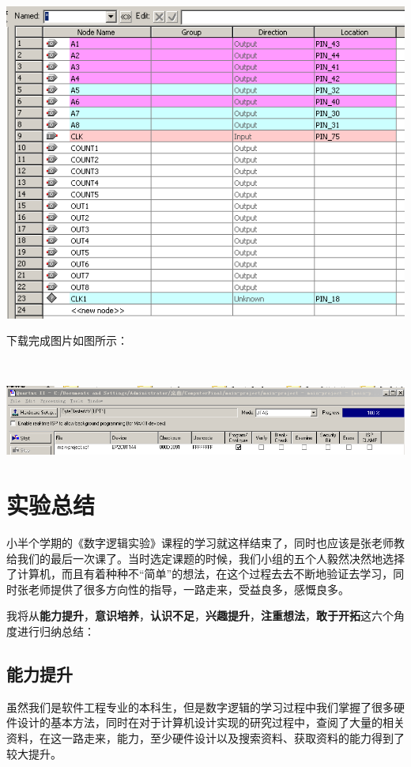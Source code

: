\documentclass[UTF8]{ctexart}
\begin{document}
    \includegraphics[width=1.0\textwidth]{./img/引脚使用.png}

    下载完成图片如图所示：

    ~

    \includegraphics[width=1.0\textwidth]{./img/下载成功.png}

    \newpage

    \section{实验总结}
    小半个学期的《数字逻辑实验》课程的学习就这样结束了，同时也应该是张老师教给我们的最后一次课了。当时选定课题的时候，我们小组的五个人毅然决然地选择了计算机，而且有着种种不“简单”的想法，在这个过程去去不断地验证去学习，同时张老师提供了很多方向性的指导，一路走来，受益良多，感慨良多。

   	我将从\textbf{能力提升}，\textbf{意识培养}，\textbf{认识不足}，\textbf{兴趣提升}，\textbf{注重想法}，\textbf{敢于开拓}这六个角度进行归纳总结：

   	\subsection{能力提升}
    虽然我们是软件工程专业的本科生，但是数字逻辑的学习过程中我们掌握了很多硬件设计的基本方法，同时在对于计算机设计实现的研究过程中，查阅了大量的相关资料，在这一路走来，能力，至少硬件设计以及搜索资料、获取资料的能力得到了较大提升。
\end{document}
